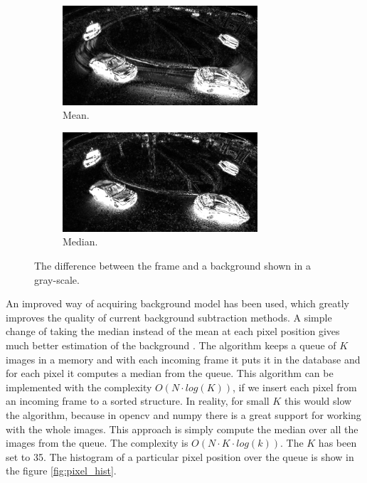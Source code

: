 \documentclass[a4paper,12pt,titlepage, twoside]{article}
\numberwithin{figure}{section}
\begin{document}
\begin{figure}
    \begin{subfigure}[Sample1]{0.5\linewidth}
        \includegraphics[height=37mm]{fig/threshold_mean_crop.png}
        \caption{Mean.}
        \label{fig:threshold_mean}
    \end{subfigure}
    \qquad
    \begin{subfigure}[Sample1]{0.5\linewidth}    
        \includegraphics[height=37mm]{fig/threshold_med_crop.png}
        \caption{Median.}
        \label{fig:threshold_med}    
    \end{subfigure} 
    \caption{The difference between the frame and a background shown in a gray-scale.}
\end{figure}

An improved way of acquiring background model has been used, which greatly improves the quality of current background subtraction methods. A simple change of taking the median instead of the mean at each pixel position gives much better estimation of the background \cite{bgs-med1, bgs-med2}. The algorithm keeps a queue of $K$ images in a memory and with each incoming frame it puts it in the database and for each pixel it computes a median from the queue. This algorithm can be implemented with the complexity $O(N \cdot log(K))$, if we insert each pixel from an incoming frame to a sorted structure. In reality, for small $K$ this would slow the algorithm, because in opencv and numpy there is a great support for working with the whole images. This approach is simply compute the median over all the images from the queue. The complexity is $O(N \cdot K \cdot log(k)).$ The $K$ has been set to 35. The histogram of a particular pixel position over the queue is show in the figure \ref{fig:pixel_hist}.
\end{document}
